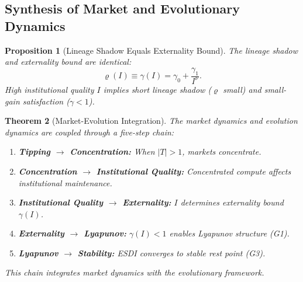 \documentclass[12pt]{article}
\newtheorem{theorem}{Theorem}[section]
\newtheorem{proposition}[theorem]{Proposition}
\begin{document}
\subsection{Synthesis of Market and Evolutionary Dynamics}

\begin{proposition}[Lineage Shadow Equals Externality Bound]
\label{prop:unification}
The lineage shadow and externality bound are identical:
\[
\varrho(I) \equiv \gamma(I) = \gamma_0 + \frac{\gamma_1}{I^\nu}.
\]
High institutional quality $I$ implies short lineage shadow ($\varrho$ small) and small-gain satisfaction ($\gamma < 1$).
\end{proposition}

\begin{theorem}[Market-Evolution Integration]
\label{thm:integration}
The market dynamics and evolution dynamics are coupled through a five-step chain:
\begin{enumerate}
    \item \textbf{Tipping $\to$ Concentration:} When $|T| > 1$, markets concentrate.
    \item \textbf{Concentration $\to$ Institutional Quality:} Concentrated compute affects institutional maintenance.
    \item \textbf{Institutional Quality $\to$ Externality:} $I$ determines externality bound $\gamma(I)$.
    \item \textbf{Externality $\to$ Lyapunov:} $\gamma(I) < 1$ enables Lyapunov structure (G1).
    \item \textbf{Lyapunov $\to$ Stability:} ESDI converges to stable rest point (G3).
\end{enumerate}
This chain integrates market dynamics with the evolutionary framework.
\end{theorem}
\end{document}
